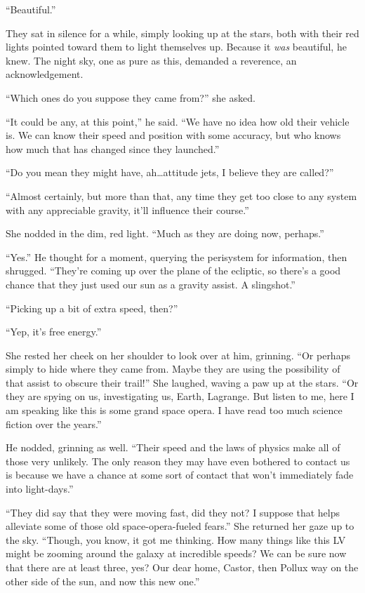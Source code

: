 ``Beautiful.''

They sat in silence for a while, simply looking up at the stars, both with their red lights pointed toward them to light themselves up. Because it \emph{was} beautiful, he knew. The night sky, one as pure as this, demanded a reverence, an acknowledgement.

``Which ones do you suppose they came from?'' she asked.

``It could be any, at this point,'' he said. ``We have no idea how old their vehicle is. We can know their speed and position with some accuracy, but who knows how much that has changed since they launched.''

``Do you mean they might have, ah\ldots attitude jets, I believe they are called?''

``Almost certainly, but more than that, any time they get too close to any system with any appreciable gravity, it'll influence their course.''

She nodded in the dim, red light. ``Much as they are doing now, perhaps.''

``Yes.'' He thought for a moment, querying the perisystem for information, then shrugged. ``They're coming up over the plane of the ecliptic, so there's a good chance that they just used our sun as a gravity assist. A slingshot.''

``Picking up a bit of extra speed, then?''

``Yep, it's free energy.''

She rested her cheek on her shoulder to look over at him, grinning. ``Or perhaps simply to hide where they came from. Maybe they are using the possibility of that assist to obscure their trail!'' She laughed, waving a paw up at the stars. ``Or they are spying on us, investigating us, Earth, Lagrange. But listen to me, here I am speaking like this is some grand space opera. I have read too much science fiction over the years.''

He nodded, grinning as well. ``Their speed and the laws of physics make all of those very unlikely. The only reason they may have even bothered to contact us is because we have a chance at some sort of contact that won't immediately fade into light-days.''

``They did say that they were moving fast, did they not? I suppose that helps alleviate some of those old space-opera-fueled fears.'' She returned her gaze up to the sky. ``Though, you know, it got me thinking. How many things like this LV might be zooming around the galaxy at incredible speeds? We can be sure now that there are at least three, yes? Our dear home, Castor, then Pollux way on the other side of the sun, and now this new one.''


